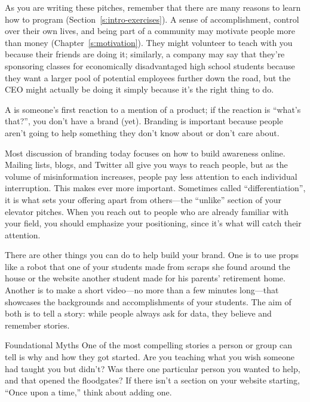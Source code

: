 As you are writing these pitches,
remember that there are many reasons to learn how to program
(Section~\ref{s:intro-exercises}).
A sense of accomplishment,
control over their own lives,
and being part of a community may motivate people more than money
(Chapter~\ref{s:motivation}).
They might volunteer to teach with you because their friends are doing it;
similarly,
a company may say that they're sponsoring classes for economically disadvantaged high school students
because they want a larger pool of potential employees further down the road,
but the CEO might actually be doing it simply because it's the right thing to do.


A  is someone's first reaction to a mention of a product;
if the reaction is ``what's that?'',
you don't have a brand (yet).
Branding is important because
people aren't going to help something they don't know about or don't care about.

Most discussion of branding today focuses on
how to build awareness online.
Mailing lists,
blogs,
and Twitter all give you ways to reach people,
but as the volume of misinformation increases,
people pay less attention to each individual interruption.
This makes  ever more important.
Sometimes called ``differentiation'',
it is what sets your offering apart from others---the ``unlike'' section of your elevator pitches.
When you reach out to people who are already familiar with your field,
you should emphasize your positioning,
since it's what will catch their attention.

There are other things you can do to help build your brand.
One is to use props
like a robot that one of your students made from scraps she found around the house
or the website another student made for his parents' retirement home.
Another is to make a short video---no more than a few minutes long---that showcases
the backgrounds and accomplishments of your students.
The aim of both is to tell a story:
while people always ask for data,
they believe and remember stories.

\begin{aside}{Foundational Myths}
  One of the most compelling stories a person or group can tell is
  why and how they got started.
  Are you teaching what you wish someone had taught you but didn't?
  Was there one particular person you wanted to help,
  and that opened the floodgates?
  If there isn't a section on your website starting, ``Once upon a time,''
  think about adding one.
\end{aside}

